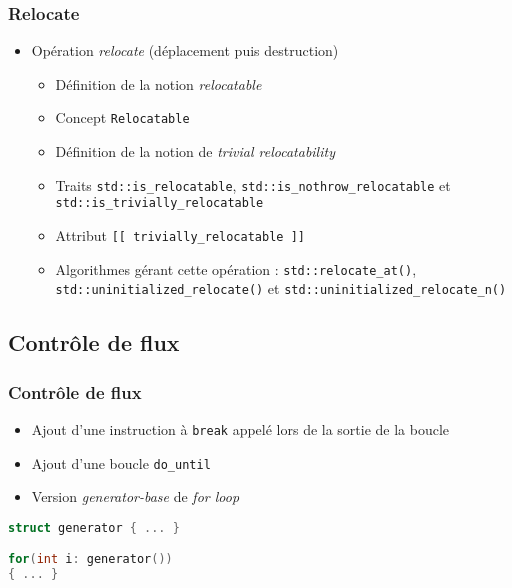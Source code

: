 \documentclass[C++.tex]{subfiles}
\begin{document}
\begin{frame}[fragile]
	\frametitle{Relocate}
	\begin{itemize}
		\item Opération \textit{relocate} (déplacement puis destruction)


		\begin{itemize}
			\item Définition de la notion \textit{relocatable}
			\item Concept \lstinline|Relocatable|


			\item Définition de la notion de \textit{trivial relocatability}


			\item Traits \lstinline|std::is_relocatable|, \lstinline|std::is_nothrow_relocatable| et \lstinline|std::is_trivially_relocatable|
			\item Attribut \lstinline|[[ trivially_relocatable ]]|
			\item Algorithmes gérant cette opération : \lstinline|std::relocate_at()|, \lstinline|std::uninitialized_relocate()| et \lstinline|std::uninitialized_relocate_n()|
		\end{itemize}
	\end{itemize}
\end{frame}

\subsection*{Contrôle de flux}
\begin{frame}[fragile]
	\frametitle{Contrôle de flux}
	\begin{itemize}
		\item Ajout d'une instruction à \lstinline|break| appelé lors de la sortie de la boucle


		\item Ajout d'une boucle \lstinline|do_until|
		\item Version \textit{generator-base} de \textit{for loop}
	\end{itemize}

	\begin{lstlisting}[language=C++]
struct generator { ... }

for(int i: generator())
{ ... }\end{lstlisting}
\end{frame}
\end{document}
